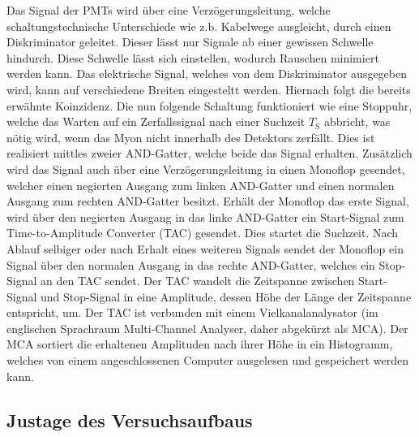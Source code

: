 Das Signal der PMTs wird über eine Verzögerungsleitung, welche schaltungstechnische Unterschiede
wie z.b. Kabelwege ausgleicht, durch einen Diskriminator geleitet. Dieser lässt nur Signale ab
einer gewissen Schwelle hindurch. Diese Schwelle lässt sich einstellen, wodurch Rauschen
minimiert werden kann. Das elektrische Signal, welches von dem Diskriminator ausgegeben wird,
kann auf verschiedene Breiten eingesteltt werden. Hiernach folgt die bereits erwähnte Koinzidenz.
Die nun folgende Schaltung funktioniert wie eine Stoppuhr, welche das Warten auf ein Zerfallssignal
nach einer Suchzeit $T_{\text{S}}$ abbricht, was nötig wird, wenn das Myon nicht innerhalb des Detektors
zerfällt. Dies ist realisiert mittles zweier AND-Gatter, welche beide das Signal erhalten. Zusätzlich
wird das Signal auch über eine Verzögerungsleitung in einen Monoflop gesendet, welcher einen negierten
Ausgang zum linken AND-Gatter und einen normalen Ausgang zum rechten AND-Gatter besitzt. Erhält der
Monoflop das erste Signal, wird über den negierten Ausgang in das linke AND-Gatter ein Start-Signal zum
Time-to-Amplitude Converter (TAC) gesendet. Dies startet die Suchzeit. Nach Ablauf selbiger oder
nach Erhalt eines weiteren Signals sendet der Monoflop ein Signal über den normalen Ausgang in
das rechte AND-Gatter, welches ein Stop-Signal an den TAC sendet.
Der TAC wandelt die Zeitspanne zwischen Start-Signal und Stop-Signal in eine Amplitude, dessen Höhe der
Länge der Zeitspanne entspricht, um.
Der TAC ist verbunden mit einem Vielkanalanalysator (im englischen Sprachraum Multi-Channel Analyser, daher abgekürzt als MCA).
Der MCA sortiert die erhaltenen Amplituden nach ihrer Höhe in ein Histogramm, welches von einem
angeschlossenen Computer ausgelesen und gespeichert werden kann.

\subsection{Justage des Versuchsaufbaus}
\label{JustageVersuchsaufbau}
